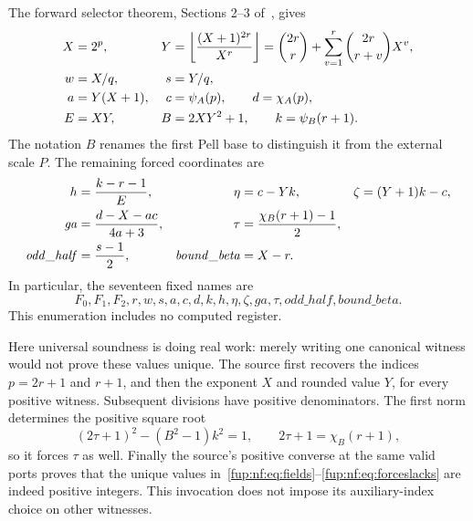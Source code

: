 \documentclass[11pt,letterpaper]{article}
\theoremstyle{definition}\newtheorem{definition}[theorem]{Definition}
\theoremstyle{remark}\newtheorem{remark}[theorem]{Remark}
\newcommand{\floor}[1]{\left\lfloor #1\right\rfloor}
\begin{document}
The forward selector theorem, Sections 2--3 of~\cite{fup:nf:selector}, gives
\begin{align}\label{fup:nf:eq:forcecore}
 X&=2^p,&
 Y&=\floor{\frac{(X+1)^{2r}}{X^r}}
   =\binom{2r}{r}+\sum_{v=1}^r\binom{2r}{r+v}X^v,\notag\\
 w&=X/q,&s&=Y/q,\notag\\
 a&=Y(X+1),& c&=\psi_A(p),\qquad d=\chi_A(p),\\
 E&=XY,& B&=2XY^2+1,\qquad k=\psi_B(r+1).\notag
\end{align}
The notation $B$ renames the first Pell base to distinguish it from the external scale $P$. The remaining forced coordinates are
\begin{align}\label{fup:nf:eq:forceslacks}
 h&=\frac{k-r-1}{E},&\eta&=c-Yk,&\zeta&=(Y+1)k-c,\notag\\
 \mathit{ga}&=\frac{d-X-ac}{4a+3},&
 \tau&=\frac{\chi_B(r+1)-1}{2},\\
 \mathit{odd\_half}&=\frac{s-1}{2},&
 \mathit{bound\_beta}&=X-r.\notag
\end{align}
In particular, the seventeen fixed names are
\[
 F_0,F_1,F_2,r,w,s,a,c,d,k,h,\eta,\zeta,\mathit{ga},
 \tau,\mathit{odd\_half},\mathit{bound\_beta}.
\]
This enumeration includes no computed register.

Here universal soundness is doing real work: merely writing one canonical witness would not prove these values unique. The source first recovers the indices $p=2r+1$ and $r+1$, and then the exponent $X$ and rounded value $Y$, for every positive witness. Subsequent divisions have positive denominators. The first norm determines the positive square root
\[
 (2\tau+1)^2-(B^2-1)k^2=1,
 \qquad 2\tau+1=\chi_B(r+1),
\]
so it forces $\tau$ as well. Finally the source's positive converse at the same valid ports proves that the unique values in~\eqref{fup:nf:eq:fields}--\eqref{fup:nf:eq:forceslacks} are indeed positive integers. This invocation does not impose its auxiliary-index choice on other witnesses.
\end{document}
